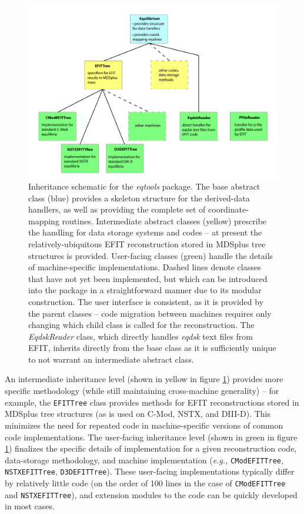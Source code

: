 \documentclass[12pt,floatfix,showpacs]{revtex4-1}
\newcommand{\eg}{\emph{e.g., }}
\newcommand{\gnote}[1]{\marginpar{\textcolor{red}{\scriptsize{#1}}}}
\begin{document}
\begin{figure}[p]
 \includegraphics[width=\textwidth]{graphics/flowchart.pdf}
 \caption{Inheritance schematic for the \emph{eqtools} package.  The base abstract class (blue) provides a skeleton structure for the derived-data handlers, as well as providing the complete set of coordinate-mapping routines.  Intermediate abstract classes (yellow) prescribe the handling for data storage systems and codes -- at present the relatively-ubiquitous EFIT reconstruction stored in MDSplus tree structures is provided.  User-facing classes (green) handle the details of machine-specific implementations.  Dashed lines denote classes that have not yet been implemented, but which can be introduced into the package in a straightforward manner due to its modular construction.  The user interface is consistent, as it is provided by the parent classes -- code migration between machines requires only changing which child class is called for the reconstruction.  The \emph{EqdskReader} class, which directly handles \emph{eqdsk} text files from EFIT, inherits directly from the base class as it is sufficiently unique to not warrant an intermediate abstract class.}
 \label{fig:flowchart}
\end{figure}

An intermediate inheritance level (shown in yellow in figure \ref{fig:flowchart}) provides more specific methodology (while still maintaining cross-machine generality) -- for example, the \verb|EFITTree| class provides methods for EFIT reconstructions stored in MDSplus tree structures (as is used on C-Mod, NSTX, and DIII-D\gnote{cites?}).  This minimizes the need for repeated code in machine-specific versions of common code implementations.  The user-facing inheritance level (shown in green in figure \ref{fig:flowchart}) finalizes the specific details of implementation for a given reconstruction code, data-storage methodology, and machine implementation (\eg \verb|CModEFITTree|, \verb|NSTXEFITTree|, \verb|D3DEFITTree|).  These user-facing implementations typically differ by relatively little code (on the order of 100 lines in the case of \verb|CModEFITTree| and \verb|NSTXEFITTree|), and extension modules to the code can be quickly developed in most cases.\gnote{check line count}
\end{document}
